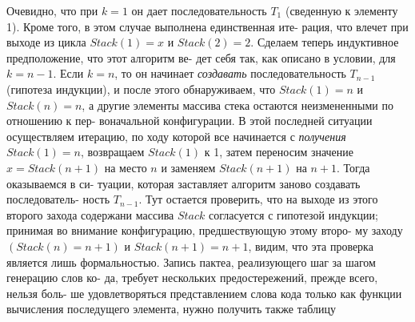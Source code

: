 Очевидно, что при $k=1$ он дает последовательность $T_1$ (сведенную к\linebreak
элементу 1). Кроме того, в этом случае выполнена единственная ите-\linebreak
рация, что влечет при выходе из цикла $Stack(1)=x$ и $Stack(2)=2$.\newline
\hspace*{15pt}Сделаем теперь индуктивное предположение, что этот алгоритм ве-\linebreak
дет себя так, как описано в условии, для
$k=n-1$. Если $k=n$, то он\linebreak
начинает \textit{создавать} последовательность $T_{n-1}$ (гипотеза индукции), и\linebreak
после этого обнаруживаем, что $Stack(1)=n$ и $Stack(n)=n$, а другие\linebreak
элементы массива стека остаются неизмененными по отношению к пер-\linebreak
воначальной конфигурации. В этой последней ситуации осуществляем\linebreak
итерацию, по ходу которой все начинается
с \textit{получения} $Stack(1)=n$,\linebreak
возвращаем $Stack(1)$ к 1, затем переносим значение $x=Stack(n+1)$\linebreak
на место $n$ и заменяем $Stack(n+1)$ на $n+1$. Тогда оказываемся в си-\linebreak
туации, которая заставляет алгоритм заново создавать последователь-\linebreak
ность $T_{n-1}$. Тут остается проверить, что на выходе из этого второго\linebreak
захода содержани массива $Stack$ согласуется с гипотезой индукции;\linebreak
принимая во внимание конфигурацию, предшествующую этому второ-\linebreak
му заходу $(Stack(n)=n+1)$ и $Stack(n+1)=n+1$, видим, что эта\linebreak
проверка является лишь формальностью.\newline
\hspace*{15pt}Запись пактеа, реализующего шаг за шагом генерацию слов ко-\linebreak
да, требует нескольких предостережений, прежде всего, нельзя боль-\linebreak
ше удовлетворяться представлением слова кода только как функции\linebreak
вычисления последущего элемента, нужно получить также таблицу\linebreak
